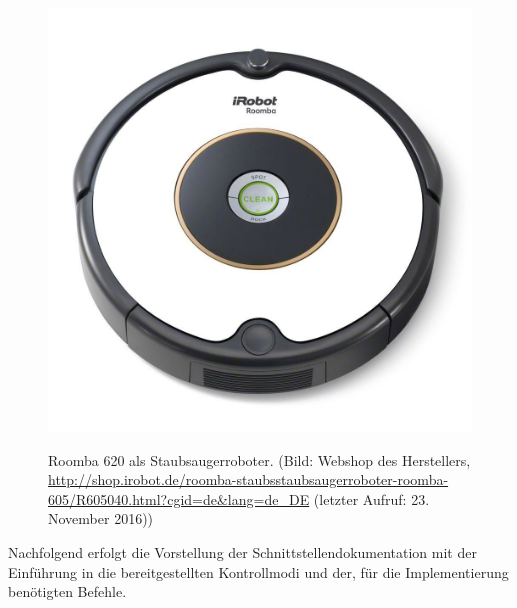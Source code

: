 \begin{figure}[ht]
\begin{minipage}[b]{\linewidth} 
      \centering 
\includegraphics[scale=0.15]{bilder/implementierung/Roomba.jpg}\label{fig:roombaSub1} 
   \end{minipage}%
   \hfill
\caption{Roomba 620 als Staubsaugerroboter. (Bild: Webshop des Herstellers, \url{http://shop.irobot.de/roomba-staubsstaubsaugerroboter-roomba-605/R605040.html?cgid=de\&lang=de_DE} (letzter Aufruf: 23. November 2016))}
\label{fig:roomba}
\end{figure}

Nachfolgend erfolgt die Vorstellung der Schnittstellendokumentation mit der Einführung in die bereitgestellten Kontrollmodi und der, für die Implementierung benötigten Befehle.


